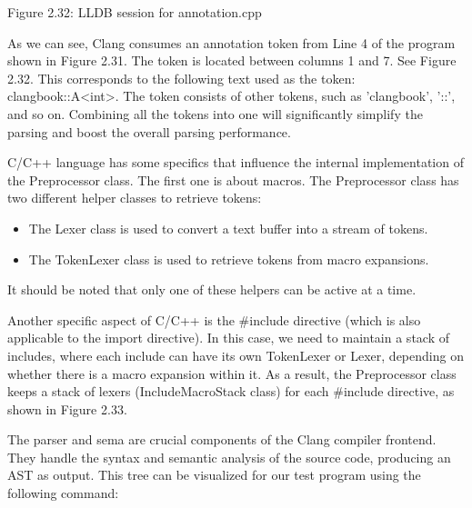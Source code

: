\begin{center}
Figure 2.32: LLDB session for annotation.cpp
\end{center}

As we can see, Clang consumes an annotation token from Line 4 of the program shown in Figure 2.31. The token is located between columns 1 and 7. See Figure 2.32. This corresponds to the following text used as the token: clangbook::A<int>. The token consists of other tokens, such as ’clangbook’, ’::’, and so on. Combining all the tokens into one will significantly simplify the parsing and boost the overall parsing performance.


C/C++ language has some specifics that influence the internal implementation of the Preprocessor class. The first one is about macros. The Preprocessor class has two different helper classes to retrieve tokens:

\begin{itemize}
\item
The Lexer class is used to convert a text buffer into a stream of tokens.

\item
The TokenLexer class is used to retrieve tokens from macro expansions.
\end{itemize}

It should be noted that only one of these helpers can be active at a time.

Another specific aspect of C/C++ is the \#include directive (which is also applicable to the import directive). In this case, we need to maintain a stack of includes, where each include can have its own TokenLexer or Lexer, depending on whether there is a macro expansion within it. As a result, the Preprocessor class keeps a stack of lexers (IncludeMacroStack class) for each \#include directive, as shown in Figure 2.33.


The parser and sema are crucial components of the Clang compiler frontend. They handle the syntax and semantic analysis of the source code, producing an AST as output. This tree can be visualized for our test program using the following command:


